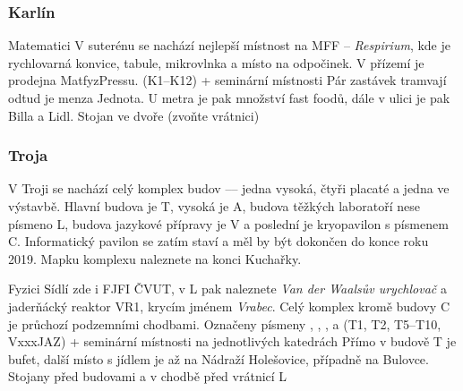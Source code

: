 \subsubsection{Karlín}

{Matematici}
{V suterénu se nachází nejlepší místnost na MFF -- \textit{Respirium}, kde je rychlovarná konvice, tabule, mikrovlnka a místo na odpočinek. V přízemí je prodejna MatfyzPressu.}
{ (K1--K12) + seminární místnosti}
{Pár zastávek tramvají odtud je menza Jednota. U metra je pak množství fast foodů, dále v ulici je pak Billa a Lidl.}
{Stojan ve dvoře (zvoňte vrátnici)}

\subsubsection{Troja}
V Troji se nachází celý komplex budov –– jedna vysoká, čtyři placaté a jedna ve výstavbě. Hlavní budova je T, vysoká je A, budova těžkých laboratoří nese písmeno L, budova jazykové přípravy je V a poslední je kryopavilon s písmenem C. Informatický pavilon se zatím staví a měl by být dokončen do konce roku 2019. Mapku komplexu naleznete na konci Kuchařky.

{Fyzici}
{Sídlí zde i FJFI ČVUT, v L pak naleznete \textit{Van der Waalsův urychlovač} a jaderňácký reaktor VR1, krycím jménem
\textit{Vrabec}. Celý komplex kromě budovy C je průchozí podzemními chodbami.}
{Označeny písmeny , , ,  a  (T1, T2, T5--T10,
VxxxJAZ) + seminární místnosti na
jednotlivých katedrách}
{Přímo v budově T je bufet, další místo s jídlem je až na Nádraží Holešovice, případně na Bulovce.}
{Stojany před budovami a v chodbě před vrátnicí L}
